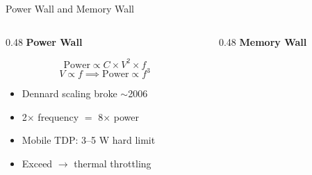 \documentclass[aspectratio=169, 12pt]{beamer}
\begin{document}
\begin{frame}{Power Wall and Memory Wall}
\note{
%
%
%
%
%
}

\footnotesize
\begin{columns}[T]
  \begin{column}{0.48\textwidth}
    \textcolor{errorstroke}{\textbf{Power Wall}}

    \vspace{0.1cm}
    $$\text{Power} \propto C \times V^2 \times f$$
    $$V \propto f \implies \text{Power} \propto f^3$$

    \vspace{0.1cm}
    \begin{itemize}\setlength\itemsep{1pt}
      \item Dennard scaling broke $\sim$2006
      \item 2$\times$ frequency $=$ 8$\times$ power
      \item Mobile TDP: 3--5 W hard limit
      \item Exceed $\to$ thermal throttling
    \end{itemize}

    \vspace{0.05cm}
  \end{column}
  \begin{column}{0.48\textwidth}
    \textcolor{datastroke}{\textbf{Memory Wall}}


\end{column}
\end{columns}
\end{frame}
\end{document}
